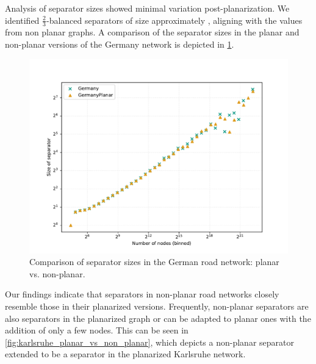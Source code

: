 Analysis of separator sizes showed minimal variation post-planarization. We
identified \(\frac{2}{3}\)-balanced separators of size approximately
, aligning with the values from non planar graphs. A comparison of
the separator sizes in the planar and non-planar versions of the Germany
network is depicted in \cref{fig:germany_planar_vs_non_planar}.

\begin{figure}
	\centering
	\includegraphics[width=0.8\linewidth]{graphics/GermanyPlanarVsNonPlanar.pdf}
	\caption{Comparison of separator sizes in the German road network: planar vs. non-planar.}
	\label{fig:germany_planar_vs_non_planar}
\end{figure}

Our findings indicate that separators in non-planar road networks closely
resemble those in their planarized versions. Frequently, non-planar separators
are also separators in the planarized graph or can be adapted to planar ones
with the addition of only a few nodes. This can be seen in
\cref{fig:karlsruhe_planar_vs_non_planar}, which depicts a non-planar separator
extended to be a separator in the planarized Karlsruhe network.


